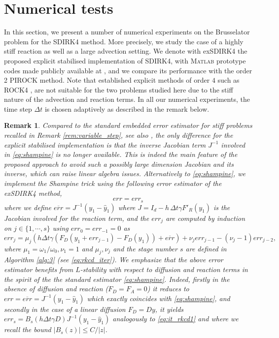 \documentclass[10pt,a4paper]{article}
\newtheorem{remark}[theorem]{Remark}
\begin{document}
  

  
	\section{Numerical tests}
 \label{sec:num}
In this section, we present a number of  numerical experiments on the Brusselator problem for the SDIRK4 method. More precisely, we study the case of a highly stiff reaction as well as a large advection setting.  We denote with exSDIRK4  the proposed explicit stabilised implementation of SDIRK4, with \textsc{Matlab} prototype codes made publicly available at \cite{codesMatlabexSDIRK26}, and we compare its performance with the order 2 PIROCK method. Note that established explicit methods of order $4$ such as ROCK4 \cite{Abd02}, are not suitable for the two problems studied here due to the stiff nature of the advection and reaction terms. In all our numerical experiments, the time step $\Delta t$ is chosen adaptively as described in the remark below. 
\begin{remark} 
Compared to the standard embedded error estimator for stiff problems recalled in Remark \ref{rem:variable_step}, see also \cite[Chap. IV.6]{HaW96}, the only difference for the explicit stabilised implementation is that the inverse Jacobian term $J^{-1}$ involved in \eqref{eq:shampine} is no longer available. This is indeed the main feature of the proposed approach to avoid such a possibly large dimension Jacobian and its inverse, which can raise linear algebra issues. Alternatively to \eqref{eq:shampine}, we implement the Shampine trick using the following error estimator of the exSDIRK4 method,
$$
err={err}_s
$$
where we define $\overline {err}= J^{-1}(y_1-\hat y_1)$ where $J = I_{d} - h\, \Delta t \gamma F'_R(y_1)$ is the Jacobian involved for the reaction term, and the ${err}_j$ are computed by induction on $j\in \{1,\cdots,s\}$ using ${err}_0 = {err}_{-1} = 0$ as
$${err}_j = \mu_j \left(h \Delta t \gamma (F_D(y_1+{err}_{j-1}) - F_D(y_1))+ \overline{err}\right)+
\nu_j {err}_{j-1}-(\nu_j-1) {err}_{j-2},$$ 
where $\mu_1 = \omega_1/\omega_0, \nu_1=1$ and $\mu_j,\nu_j$ and the stage number $s$ are defined in Algorithm \ref{alg:3} (see \eqref{eq:rkcd_iter}).
We emphasize that the above error estimator benefits from $L$-stability with respect to diffusion and reaction terms in the spirit of the the standard estimator \eqref{eq:shampine}. Indeed, firstly in the absence of diffusion and reaction ($F_D=F_A=0$) it reduces to $err=\overline{err}=J^{-1}(y_1-\hat y_1)$ which exactly coincides with \eqref{eq:shampine}, and secondly in the case of a linear diffusion $F_D=Dy$, it yields $err_s=B_s(h\Delta t \gamma D) J^{-1} (y_1-\hat y_1)$ analogously to \eqref{eq:it_rkcd1} and where we recall the bound $|B_s(z)|\leq C/|z|$.
\end{remark}
\end{document}
